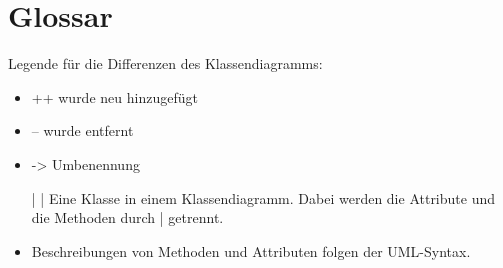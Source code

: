 \section{Glossar}
Legende für die Differenzen des Klassendiagramms:
  \begin{itemize}
    \item ++ wurde neu hinzugefügt
    \item -- wurde entfernt
    \item -> Umbenennung
    \item [ | | ] Eine Klasse in einem Klassendiagramm. Dabei werden die Attribute und die Methoden durch | getrennt.
    \item Beschreibungen von Methoden und Attributen folgen der UML-Syntax.
  \end{itemize}
